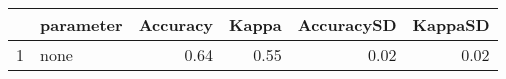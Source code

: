 \begin{table}[ht]
\begin{center}
{\tiny
\begin{tabular}{rlrrrr}
  \hline
 & parameter & Accuracy & Kappa & AccuracySD & KappaSD \\ 
  \hline
1 & none & 0.64 & 0.55 & 0.02 & 0.02 \\ 
   \hline
\end{tabular}
}
\end{center}
\end{table}
